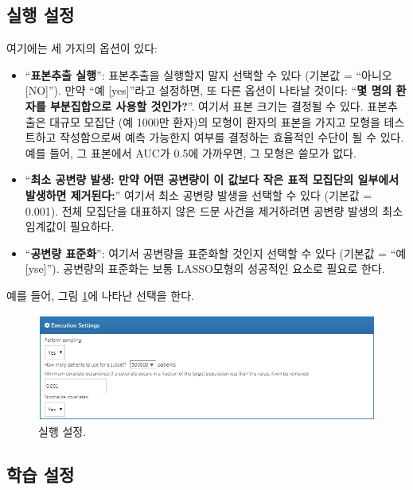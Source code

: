 \documentclass[11pt]{book}
\providecommand{\tightlist}{%
  \setlength{\itemsep}{0pt}\setlength{\parskip}{0pt}}
\theoremstyle{definition}
\theoremstyle{definition}
\theoremstyle{definition}
\theoremstyle{remark}
\begin{document}
\subsection{실행 설정}\label{-}

여기에는 세 가지의 옵션이 있다:

\begin{itemize}
\tightlist
\item
  ``\textbf{표본추출 실행}'': 표본추출을 실행할지 말지 선택할 수 있다
  (기본값 = ``아니오 {[}NO{]}''). 만약 ``예 {[}yes{]}''라고 설정하면, 또
  다른 옵션이 나타날 것이다: ``\textbf{몇 명의 환자를 부분집합으로
  사용할 것인가?}''. 여기서 표본 크기는 결정될 수 있다. 표본추출은
  대규모 모집단 (예 1000만 환자)의 모형이 환자의 표본을 가지고 모형을
  테스트하고 작성함으로써 예측 가능한지 여부를 결정하는 효율적인 수단이
  될 수 있다. 예를 들어, 그 표본에서 AUC가 0.5에 가까우면, 그 모형은
  쓸모가 없다.
\item
  ``\textbf{최소 공변량 발생: 만약 어떤 공변량이 이 값보다 작은 표적
  모집단의 일부에서 발생하면 제거된다:}'' 여기서 최소 공변량 발생을
  선택할 수 있다 (기본값 = 0.001). 전체 모집단을 대표하지 않은 드문
  사건을 제거하려면 공변량 발생의 최소 임계값이 필요하다.
\item
  ``\textbf{공변량 표준화}'': 여기서 공변량을 표준화할 것인지 선택할 수
  있다 (기본값 = ``예 {[}yse{]}''). 공변량의 표준화는 보통 LASSO모형의
  성공적인 요소로 필요로 한다.
\end{itemize}

예를 들어, 그림 \ref{fig:executionSettings}에 나타난 선택을 한다.

\begin{figure}

{\centering \includegraphics[width=1\linewidth]{images/PatientLevelPrediction/executionSettings} 

}

\caption{실행 설정.}\label{fig:executionSettings}
\end{figure}

\subsection{학습 설정}\label{-}
\end{document}
